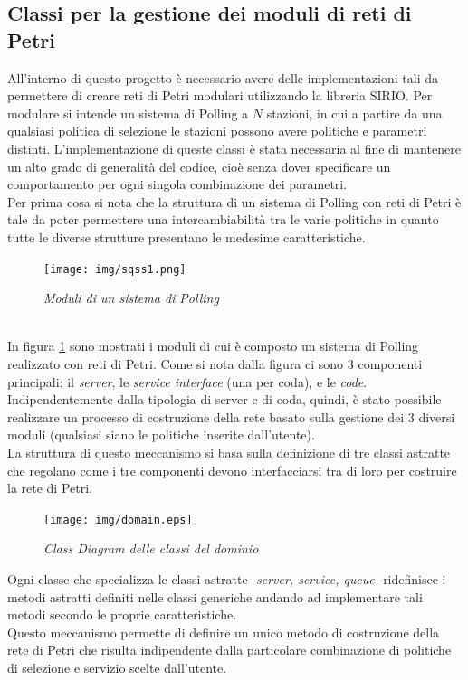 \documentclass[12pt,a4paper,italian]{article}
\begin{document}
\subsection{Classi per la gestione dei moduli di reti di Petri}
All'interno di questo progetto è necessario avere delle implementazioni tali da permettere di creare reti di Petri modulari utilizzando la libreria SIRIO. Per modulare si intende un sistema di Polling a $N$ stazioni, in cui a partire da una qualsiasi politica di selezione le stazioni possono avere politiche e parametri distinti. L'implementazione di queste classi è stata necessaria al fine di mantenere un alto grado di generalità del codice, cioè senza dover specificare un comportamento per ogni singola combinazione dei parametri.\\
Per prima cosa si nota che la struttura di un sistema di Polling con reti di Petri è tale da poter permettere una intercambiabilità tra le varie politiche in quanto tutte le diverse strutture presentano le medesime caratteristiche.\\
\begin{figure}[ht!]
	\centering
	\texttt{[image: img/sqss1.png]}
	\caption{\emph{Moduli di un sistema di Polling}}\label{modules}
\end{figure}
\ \\
In figura \ref{modules} sono mostrati i moduli di cui è composto un sistema di Polling realizzato con reti di Petri. Come si nota dalla figura ci sono 3 componenti principali: il \emph{server}, le \emph{service interface} (una per coda), e le \emph{code}. Indipendentemente dalla tipologia di server e di coda, quindi, è stato possibile realizzare un processo di costruzione della rete basato sulla gestione dei 3 diversi moduli (qualsiasi siano le politiche inserite dall'utente).\\
La struttura di questo meccanismo si basa sulla definizione di tre classi astratte che regolano come i tre componenti devono interfacciarsi tra di loro per costruire la rete di Petri.\\
\begin{figure}[ht!]
	\centering
	\texttt{[image: img/domain.eps]}
	\caption{\emph{Class Diagram delle classi del dominio}}
\end{figure}
Ogni classe che specializza le classi astratte- \emph{server, service, queue}- ridefinisce i metodi astratti definiti nelle classi generiche andando ad implementare tali metodi secondo le proprie caratteristiche.\\
Questo meccanismo permette di definire un unico metodo di costruzione della rete di Petri che risulta indipendente dalla particolare combinazione di politiche di selezione e servizio scelte dall'utente.\\
\end{document}
